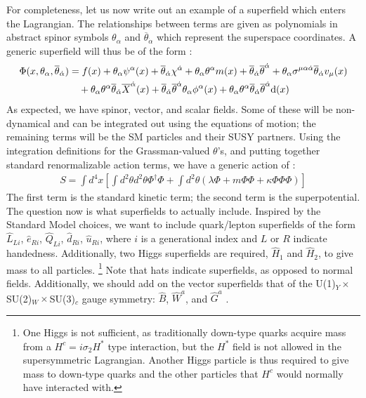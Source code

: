 For completeness, let us now write out an example of a superfield which enters the Lagrangian. The relationships between terms are given as polynomials in abstract spinor symbols $\theta_\alpha$ and $\overline{\theta}_{\dot{\alpha}}$ which represent the superspace coordinates. A generic superfield will thus be of the form \cite{Jungman}:
\begin{align}
  \Phi(x, \theta_\alpha, \overline{\theta}_{\dot{\alpha}}) &= f(x) + \theta_\alpha \psi^\alpha(x) + \overline{\theta}_{\dot{\alpha}} \chi^{\dot{\alpha}} + \theta_\alpha \theta^\alpha m(x) + \overline{\theta}_{\dot{\alpha}} \overline{\theta}^{\dot{\alpha}} + \theta_\alpha \sigma^{\mu \alpha \dot{\alpha}} \overline{\theta}_{\dot{\alpha}} v_\mu(x) \nonumber\\
  &\quad + \theta_\alpha \theta^\alpha \overline{\theta}_{\dot{\alpha}} \overline{X}^{\dot{\alpha}}(x) + \overline{\theta}_{\dot{\alpha}} \overline{\theta}^{\dot{\alpha}} \theta_\alpha \phi^\alpha (x) + \theta_\alpha \theta^\alpha \overline{\theta}_{\dot{\alpha}} \overline{\theta}^{\dot{\alpha}}\mathrm{d}(x)
\end{align}
As expected, we have spinor, vector, and scalar fields. Some of these will be non-dynamical and can be integrated out using the equations of motion; the remaining terms will be the SM particles and their SUSY partners. Using the integration definitions for the Grassman-valued $\theta$'s, and putting together standard renormalizable action terms, we have a generic action of \cite{Jungman}:
\begin{align}
  S = \int d^4 x\left[ \int d^2\theta d^2 \theta \Phi^\dagger \Phi + \int d^2\theta \left( \lambda \Phi + m \Phi \Phi + \kappa \Phi \Phi \Phi \right) \right]
\end{align}
The first term is the standard kinetic term; the second term is the superpotential. The question now is what superfields to actually include. Inspired by the Standard Model choices, we want to include quark/lepton superfields of the form $\hat{L}_{Li}$, $\hat{e}_{Ri}$, $\hat{Q}_{Li}$, $\hat{d}_{Ri}$, $\hat{u}_{Ri}$, where $i$ is a generational index and $L$ or $R$ indicate handedness. Additionally, two Higgs superfields are required, $\hat{H}_1$ and $\hat{H}_2$, to give mass to all particles. \footnote{One Higgs is not sufficient, as traditionally down-type quarks acquire mass from a $H^c = i \sigma_2 H^*$ type interaction, but the $H^*$ field is not allowed in the supersymmetric Lagrangian. Another Higgs particle is thus required to give mass to down-type quarks and the other particles that $H^c$ would normally have interacted with.} Note that hats indicate superfields, as opposed to normal fields. Additionally, we should add on the vector superfields that of the U(1)$_Y\times$SU(2)$_W\times$SU(3)$_c$ gauge symmetry: $\hat{B}$, $\hat{W}^a$, and $\hat{G}^a$ \cite{Jungman}.

